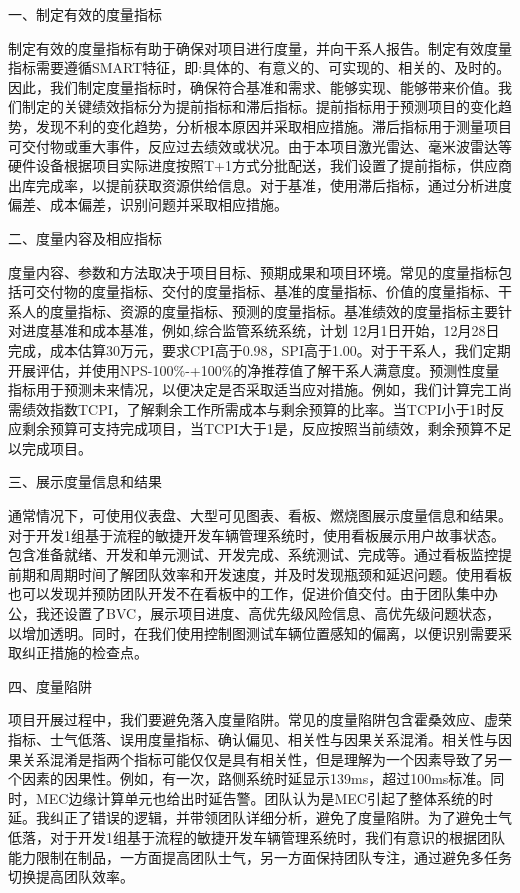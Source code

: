 \documentclass[UTF8]{../computerUniverse}
\begin{document}
一、制定有效的度量指标

制定有效的度量指标有助于确保对项目进行度量，并向干系人报告。制定有效度量指标需要遵循SMART特征，即:具体的、有意义的、可实现的、相关的、及时的。因此，我们制定度量指标时，确保符合基准和需求、能够实现、能够带来价值。我们制定的关键绩效指标分为提前指标和滞后指标。提前指标用于预测项目的变化趋势，发现不利的变化趋势，分析根本原因并采取相应措施。滞后指标用于测量项目可交付物或重大事件，反应过去绩效或状况。由于本项目激光雷达、毫米波雷达等硬件设备根据项目实际进度按照T+1方式分批配送，我们设置了提前指标，供应商出库完成率，以提前获取资源供给信息。对于基准，使用滞后指标，通过分析进度偏差、成本偏差，识别问题并采取相应措施。




二、度量内容及相应指标

度量内容、参数和方法取决于项目目标、预期成果和项目环境。常见的度量指标包括可交付物的度量指标、交付的度量指标、基准的度量指标、价值的度量指标、干系人的度量指标、资源的度量指标、预测的度量指标。基准绩效的度量指标主要针对进度基准和成本基准，例如,综合监管系统系统，计划 12月1日开始，12月28日完成，成本估算30万元，要求CPI高于0.98，SPI高于1.00。对于干系人，我们定期开展评估，并使用NPS-100\%-+100\%的净推荐值了解干系人满意度。预测性度量指标用于预测未来情况，以便决定是否采取适当应对措施。例如，我们计算完工尚需绩效指数TCPI，了解剩余工作所需成本与剩余预算的比率。当TCPI小于1时反应剩余预算可支持完成项目，当TCPI大于1是，反应按照当前绩效，剩余预算不足以完成项目。



三、展示度量信息和结果

通常情况下，可使用仪表盘、大型可见图表、看板、燃烧图展示度量信息和结果。对于开发1组基于流程的敏捷开发车辆管理系统时，使用看板展示用户故事状态。包含准备就绪、开发和单元测试、开发完成、系统测试、完成等。通过看板监控提前期和周期时间了解团队效率和开发速度，并及时发现瓶颈和延迟问题。使用看板也可以发现并预防团队开发不在看板中的工作，促进价值交付。由于团队集中办公，我还设置了BVC，展示项目进度、高优先级风险信息、高优先级问题状态，以增加透明。同时，在我们使用控制图测试车辆位置感知的偏离，以便识别需要采取纠正措施的检查点。



四、度量陷阱

项目开展过程中，我们要避免落入度量陷阱。常见的度量陷阱包含霍桑效应、虚荣指标、士气低落、误用度量指标、确认偏见、相关性与因果关系混淆。相关性与因果关系混淆是指两个指标可能仅仅是具有相关性，但是理解为一个因素导致了另一个因素的因果性。例如，有一次，路侧系统时延显示139ms，超过100ms标准。同时，MEC边缘计算单元也给出时延告警。团队认为是MEC引起了整体系统的时延。我纠正了错误的逻辑，并带领团队详细分析，避免了度量陷阱。为了避免士气低落，对于开发1组基于流程的敏捷开发车辆管理系统时，我们有意识的根据团队能力限制在制品，一方面提高团队士气，另一方面保持团队专注，通过避免多任务切换提高团队效率。
\end{document}
